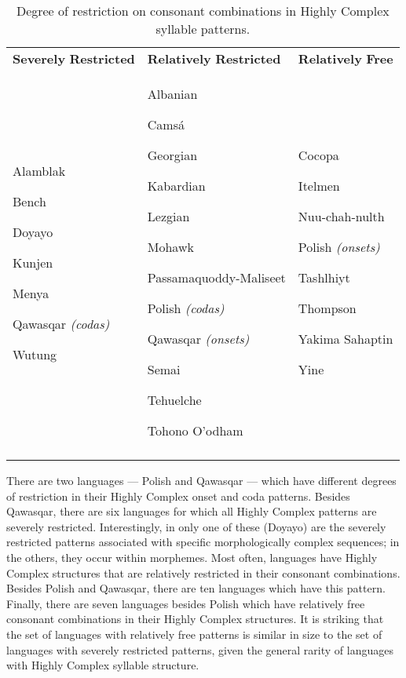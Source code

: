 \begin{table}
\begin{tabularx}{\textwidth}{XXX}
\lsptoprule

\textbf{Severely} \textbf{Restricted} & \textbf{Relatively} \textbf{Restricted}  & \textbf{Relatively} \textbf{Free}\\
Alamblak

Bench

Doyayo

Kunjen

Menya

Qawasqar \textit{(codas)}

Wutung & Albanian

Camsá

Georgian

Kabardian

Lezgian

Mohawk

Passamaquoddy-Maliseet

Polish \textit{(codas)}

Qawasqar \textit{(onsets)}

Semai

Tehuelche

Tohono O’odham & Cocopa

Itelmen

Nuu-chah-nulth

Polish \textit{(onsets)}

Tashlhiyt

Thompson

Yakima Sahaptin

Yine\\
\lspbottomrule
\end{tabularx}
\caption{\label{3.13}Degree of restriction on consonant combinations in Highly Complex syllable patterns.}
\end{table}

  There are two languages — Polish and Qawasqar — which have different degrees of restriction in their Highly Complex onset and coda patterns. Besides Qawasqar, there are six languages for which all Highly Complex patterns are severely restricted. Interestingly, in only one of these (Doyayo) are the severely restricted patterns associated with specific morphologically complex sequences; in the others, they occur within morphemes. Most often, languages have Highly Complex structures that are relatively restricted in their consonant combinations. Besides Polish and Qawasqar, there are ten languages which have this pattern. Finally, there are seven languages besides Polish which have relatively free consonant combinations in their Highly Complex structures. It is striking that the set of languages with relatively free patterns is similar in size to the set of languages with severely restricted patterns, given the general rarity of languages with Highly Complex syllable structure.

